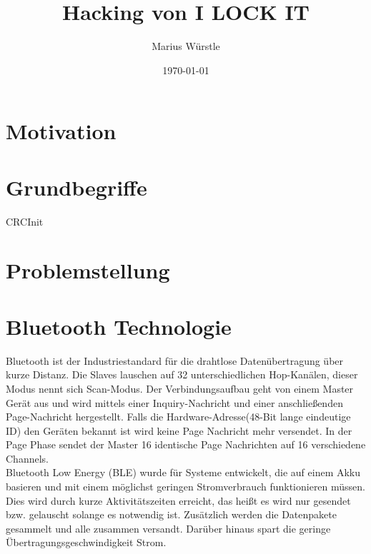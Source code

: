 \documentclass[a4paper,11pt,singlespacing]{article}
\title{Hacking von I LOCK IT}
\author{Marius Würstle}
\date{\today}
\begin{document}
	\setlength{\parindent}{0ex}
	\maketitle
	
	\tableofcontents
	\pagebreak
	
	\section{Motivation}
	
	\section{Grundbegriffe}
		CRCInit
		
	
	\section{Problemstellung}
	
	\section{Bluetooth Technologie}
		Bluetooth ist der Industriestandard für die drahtlose Datenübertragung über kurze Distanz. Die Slaves lauschen auf 32 unterschiedlichen Hop-Kanälen, dieser Modus nennt sich Scan-Modus. Der Verbindungsaufbau geht von einem Master Gerät aus und wird mittels einer Inquiry-Nachricht und einer anschließenden Page-Nachricht hergestellt. Falls die Hardware-Adresse(48-Bit lange eindeutige ID) den Geräten bekannt ist wird keine Page Nachricht mehr versendet. In der Page Phase sendet der Master 16 identische Page Nachrichten auf 16 verschiedene Channels. \\
		Bluetooth Low Energy (BLE) wurde für Systeme entwickelt, die auf einem Akku basieren und mit einem möglichst geringen Stromverbrauch funktionieren müssen. Dies wird durch kurze Aktivitätszeiten erreicht, das heißt es wird nur gesendet bzw. gelauscht solange es notwendig ist. Zusätzlich werden die Datenpakete gesammelt und alle zusammen versandt. Darüber hinaus spart die geringe Übertragungsgeschwindigkeit Strom.
		
\end{document}
